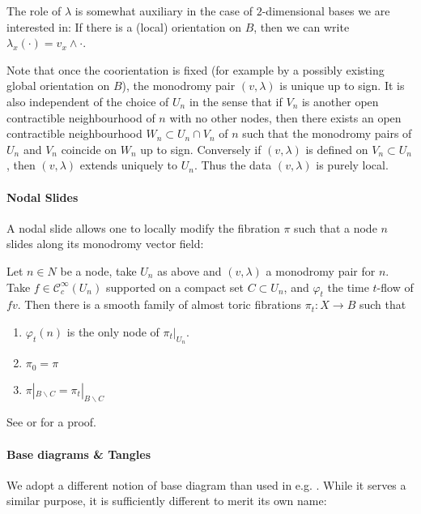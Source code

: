 \documentclass[12pt,a4paper,abstract=true,draft]{scrartcl}
\begin{document}
The role of $λ$ is somewhat auxiliary in the case of $2$-dimensional bases we are interested in: If there is a (local) orientation on $B$, then we can write $λ_x(·) = v_x ∧ ·$.

Note that once the coorientation is fixed (for example by a possibly existing global orientation on $B$), the monodromy pair $(v,λ)$ is unique up to sign.
It is also independent of the choice of $U_n$ in the sense that if $V_n$ is another open contractible neighbourhood of $n$ with no other nodes, then there exists an open contractible neighbourhood $W_n ⊂ U_n ∩ V_n$ of $n$ such that the monodromy pairs of $U_n$ and $V_n$ coincide on $W_n$ up to sign.
Conversely if $(v,λ)$ is defined on $V_n ⊂ U_n$, then $(v,λ)$ extends uniquely to $U_n$.
Thus the data $(v,λ)$ is purely local.

\paragraph{Nodal Slides}
A nodal slide allows one to locally modify the fibration $π$ such that a node $n$ slides along its monodromy vector field:

\begin{lemma}
  \label{thm:nodal_slide}
  Let $n ∈ N$ be a node, take $U_n$ as above and $(v,λ)$ a monodromy pair for $n$.
  Take $f ∈ 𝒞^∞_c(U_n)$ supported on a compact set $C ⊂ U_n$, and $φ_t$ the time $t$-flow of $fv$.
  Then there is a smooth family of almost toric fibrations $π_t \colon X → B$ such that
  \begin{enumerate}
    \item $φ_t(n)$ is the only node of $π_t|_{U_n}$.
    \item $π_0 = π$
    \item $π|_{B ∖ C} = π_t|_{B ∖ C}$
  \end{enumerate}
\end{lemma}

See \cite[Theorem 6.5]{symington2002FourDF} or \cite[Theorem 8.10]{evans2021atfs} for a proof.

\paragraph{Base diagrams \& Tangles}

We adopt a different notion of base diagram than used in e.g. \cite{symington2002FourDF,evans2021atfs}.
While it serves a similar purpose, it is sufficiently different to merit its own name:
\end{document}
